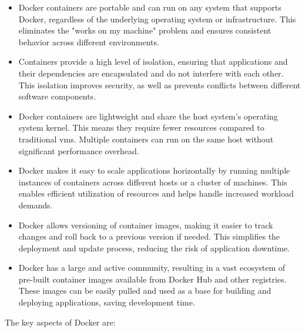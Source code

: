 \begin{itemize}
  \item Docker containers are portable and can run on any system that supports Docker, regardless of the underlying operating system or infrastructure. This eliminates the "works on my machine" problem and ensures consistent behavior across different environments.
  \item Containers provide a high level of isolation, ensuring that applications and their dependencies are encapsulated and do not interfere with each other. This isolation improves security, as well as prevents conflicts between different software components.
  \item Docker containers are lightweight and share the host system's operating system kernel. This means they require fewer resources compared to traditional \glspl{vm}. Multiple containers can run on the same host without significant performance overhead.
  \item Docker makes it easy to scale applications horizontally by running multiple instances of containers across different hosts or a cluster of machines. This enables efficient utilization of resources and helps handle increased workload demands.
  \item Docker allows versioning of container images, making it easier to track changes and roll back to a previous version if needed. This simplifies the deployment and update process, reducing the risk of application downtime.
  \item Docker has a large and active community, resulting in a vast ecosystem of pre-built container images available from Docker Hub and other registries. These images can be easily pulled and used as a base for building and deploying applications, saving development time.
\end{itemize}
The key aspects of Docker are:
